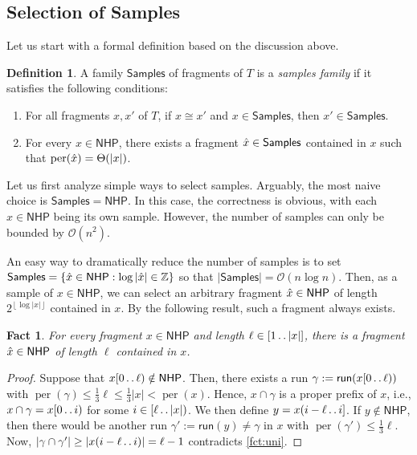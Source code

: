 \documentclass[a4paper]{article}
\newtheorem{fact}[theorem]{Fact}
\theoremstyle{definition}
\newtheorem{definition}[theorem]{Definition}
\theoremstyle{remark}
\newcommand{\R}{\mathsf{Samples}}
\newcommand{\N}{\mathsf{NHP}}
\newcommand{\floor}[1]{\left\lfloor #1 \right\rfloor}
\newcommand{\dd}{\mathinner{\ldotp\ldotp}}
\DeclareMathOperator{\per}{per}
\newcommand{\Oh}{\mathcal{O}}
\newcommand{\run}{\mathsf{run}}
\begin{document}
\subsection{Selection of Samples}\label{sec:repr}
Let us start with a formal definition based on the discussion above.
\begin{definition}\label{def:repr}
  A family $\R$ of fragments of $T$ is a \emph{samples family} if it satisfies the following conditions:
  \begin{enumerate}[label=(\alph*)]
    \item\label{it:repr:cons} For all fragments $x,x'$ of $T$, if $x\cong x'$ and $x\in \R$, then $x'\in \R$.

\smallskip
    \item\label{it:repr:dens} For every $x\in \N$, there exists a fragment $\rx\in \R$ contained in $x$ such that $\per(\rx)=\Theta(|x|)$.
  \end{enumerate}
\end{definition}

Let us first analyze simple ways to select samples. 
Arguably, the most naive choice is $\R=\N$.
In this case, the correctness is obvious, with each $x\in \N$ being its own sample.
However, the number of samples can only be bounded by $\Oh(n^2)$.

An easy way to dramatically reduce the number of samples is to set $\R = \{\rx \in \N : \log|\rx|\in \mathbb{Z}\}$ so that $|\R|=\Oh(n \log n)$. 
Then, as a sample of $x\in \N$, we can select an arbitrary fragment $\rx\in \N$
of length $2^{\floor{\log |x|}}$ contained in $x$. 
By the following result, such a fragment always exists.
\begin{fact}\label{fct:nonp}
  For every fragment $x\in \N$ and length $\ell\in [1\dd |x|]$,
  there is a fragment $\rx\in \N$ of length $\ell$ contained in $x$.
  \end{fact}
  \begin{proof}
  Suppose that $x[0\dd \ell)\notin \N$.
  Then, there exists a run $\gamma:=\run(x[0\dd \ell))$ with $\per(\gamma)\le \frac13\ell \le \frac13|x| < \per(x)$. 
  Hence, $x\cap \gamma$ is a proper prefix of $x$,
  i.e., $x\cap \gamma = x[0\dd i)$ for some $i\in [\ell\dd |x|)$.
  We then define $y=x(i-\ell\dd i]$.
  If $y\notin \N$, then there would be another run $\gamma':=\run(y)\ne \gamma$ in $x$ with $\per(\gamma')\le \frac13\ell$.
  Now, $|\gamma \cap \gamma'|\ge |x(i-\ell\dd i)| = \ell-1$ contradicts  \cref{fct:uni}.
  \end{proof}
\end{document}
